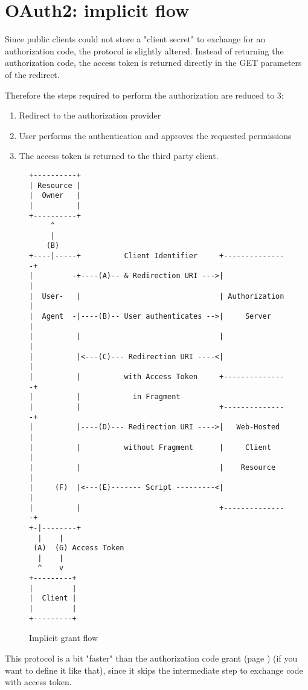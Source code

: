 \section{OAuth2: implicit flow}
\label{sec:implicit}
Since public clients could not store a "client secret" to exchange for an
authorization code, the protocol is slightly altered.
Instead of returning the authorization code, the access token is returned
directly in the GET parameters of the redirect.

Therefore the steps required to perform the authorization are reduced to 3:
\begin{enumerate}
    \item Redirect to the authorization provider
    \item User performs the authentication and approves the requested
        permissions
    \item The access token is returned to the third party client.
\end{enumerate}

\begin{figure}[h]
    \centering
    \begin{BVerbatim}
+----------+
| Resource |
|  Owner   |
|          |
+----------+
     ^
     |
    (B)
+----|-----+          Client Identifier     +---------------+
|         -+----(A)-- & Redirection URI --->|               |
|  User-   |                                | Authorization |
|  Agent  -|----(B)-- User authenticates -->|     Server    |
|          |                                |               |
|          |<---(C)--- Redirection URI ----<|               |
|          |          with Access Token     +---------------+
|          |            in Fragment
|          |                                +---------------+
|          |----(D)--- Redirection URI ---->|   Web-Hosted  |
|          |          without Fragment      |     Client    |
|          |                                |    Resource   |
|     (F)  |<---(E)------- Script ---------<|               |
|          |                                +---------------+
+-|--------+
  |    |
 (A)  (G) Access Token
  |    |
  ^    v
+---------+
|         |
|  Client |
|         |
+---------+
\end{BVerbatim}
    \caption{Implicit grant flow \cite{ietf-oauth}}
    \label{fig:authorization-implicit-grant-flow}
\end{figure}


This protocol is a bit "faster" than the authorization code grant (page
\pageref{sec:auth-code}) (if you want to define it like that), since it skips
the intermediate step to exchange code with access
token.

